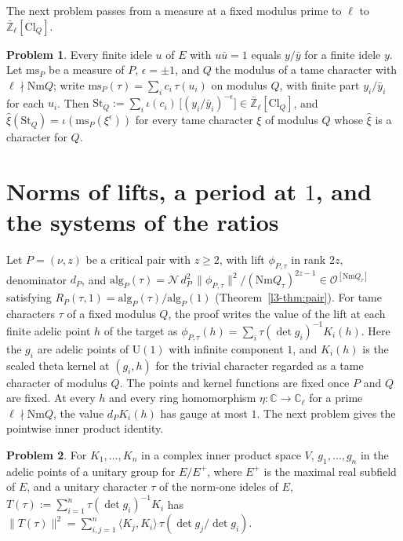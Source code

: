 \documentclass[reqno]{amsart}
\theoremstyle{definition}
\newtheorem{problem}{Problem}[section]
\theoremstyle{plain}
\theoremstyle{remark}
\newcommand{\C}{\mathbb{C}}
\newcommand{\Zl}{\bar{\mathbb{Z}}_\ell}
\newcommand{\Oc}{\mathcal{O}}
\newcommand{\Nc}{\mathcal{N}}
\newcommand{\St}{\mathrm{St}}
\newcommand{\ms}{\mathrm{ms}}
\newcommand{\alg}{\mathrm{alg}}
\newcommand{\Cl}{\mathrm{Cl}}
\newcommand{\Nm}{\mathrm{Nm}}
\begin{document}
The next problem passes from a measure at a fixed modulus prime to \(\ell\) to \(\Zl[\Cl_Q]\).

\begin{problem}\label{pr:measure-to-st}
Every finite idele \(u\) of \(E\) with \(u\bar u = 1\) equals \(y/\bar y\) for a finite idele \(y\).  Let \(\ms_P\) be a measure of \(P\), \(\epsilon = \pm 1\), and \(Q\) the modulus of a tame character with \(\ell \nmid \Nm Q\); write \(\ms_P(\tau) = \sum_i c_i\,\tau(u_i)\) on modulus \(Q\), with finite part \(y_i/\bar y_i\) for each \(u_i\).  Then \(\St_Q := \sum_i \iota(c_i)\,\bigl[(y_i/\bar y_i)^{-\epsilon}\bigr] \in \Zl[\Cl_Q]\), and \(\hat\xi(\St_Q) = \iota(\ms_P(\xi^{\epsilon}))\) for every tame character \(\xi\) of modulus \(Q\) whose \(\hat\xi\) is a character for \(Q\).
\end{problem}

\section{Norms of lifts, a period at \texorpdfstring{\(1\)}{1}, and the systems of the ratios}\label{sec:systems}

Let \(P = (\nu, z)\) be a critical pair with \(z \ge 2\), with lift \(\phi_{P,\tau}\) in rank \(2z\), denominator \(d_P\), and \(\alg_P(\tau) = \Nc\,d_P^2\,\lVert\phi_{P,\tau}\rVert^2/(\Nm Q_\tau)^{2z-1} \in \Oc^{[\Nm Q_\tau]}\) satisfying \(R_P(\tau, 1) = \alg_P(\tau)/\alg_P(1)\) (Theorem~\ref{l3-thm:pair}).  For tame characters \(\tau\) of a fixed modulus \(Q\), the proof writes the value of the lift at each finite adelic point \(h\) of the target as \(\phi_{P,\tau}(h) = \sum_i \tau(\det g_i)^{-1} K_i(h)\).  Here the \(g_i\) are adelic points of \(\mathrm U(1)\) with infinite component \(1\), and \(K_i(h)\) is the scaled theta kernel at \((g_i, h)\) for the trivial character regarded as a tame character of modulus \(Q\).  The points and kernel functions are fixed once \(P\) and \(Q\) are fixed.  At every \(h\) and every ring homomorphism \(\eta \colon \C \to \C_\ell\) for a prime \(\ell \nmid \Nm Q\), the value \(d_P K_i(h)\) has gauge at most \(1\).  The next problem gives the pointwise inner product identity.

\begin{problem}\label{pr:norm-measure}
For \(K_1, \dots, K_n\) in a complex inner product space \(V\), \(g_1, \dots, g_n\) in the adelic points of a unitary group for \(E/E^+\), where \(E^+\) is the maximal real subfield of \(E\), and a unitary character \(\tau\) of the norm-one ideles of \(E\), \(T(\tau) := \sum_{i=1}^n \tau(\det g_i)^{-1} K_i\) has \(\lVert T(\tau)\rVert^2 = \sum_{i, j = 1}^n \langle K_j, K_i\rangle\,\tau(\det g_j / \det g_i)\).
\end{problem}
\end{document}

